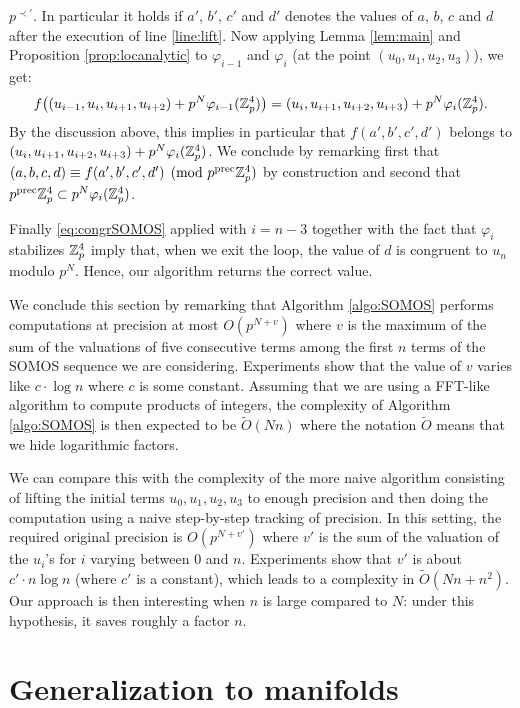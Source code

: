 \documentclass{lms}
\begin{document}
$p^{\prec'}$. In particular it holds if $a'$, $b'$, $c'$ and $d'$ denotes
the values of $a$, $b$, $c$ and $d$ after the execution of line
\ref{line:lift}. Now applying Lemma \ref{lem:main} and Proposition
\ref{prop:locanalytic} to $\varphi_{i-1}$ and $\varphi_i$ (at the point 
$(u_0, u_1, u_2, u_3)$), we get:
$$f\big((u_{i-1}, u_i, u_{i+1}, u_{i+2}) + p^N \varphi_{i-1}(\mathbb Z_p^4)\big)
= (u_i, u_{i+1}, u_{i+2}, u_{i+3}) + p^N \varphi_i(\mathbb Z_p^4).$$
By the discussion above, this implies in particular that $f(a',b',c',d')$
belongs to $(u_i, u_{i+1}, u_{i+2}, u_{i+3}) + p^N \varphi_i(\mathbb Z_p^4)$. We
conclude by remarking first that $(a,b,c,d) \equiv f(a',b',c',d') \pmod 
{p^{\text{\rm prec}} \mathbb Z_p^4}$ by construction and second that $p^{\text{\rm prec}} \mathbb Z_p^4 \subset
p^N \varphi_i(\mathbb Z_p^4)$.

Finally \eqref{eq:congrSOMOS} applied with $i = n-3$ together with
the fact that $\varphi_i$ stabilizes $\mathbb Z_p^4$ imply that, when we exit
the loop, the value of $d$ is congruent to $u_n$ modulo $p^N$. Hence,
our algorithm returns the correct value.

\medskip

We conclude this section by remarking that Algorithm 
\ref{algo:SOMOS} performs computations at precision at most $O(p^{N+v})$ 
where $v$ is the maximum of the sum of the valuations of five consecutive terms among 
the first $n$ terms of the SOMOS sequence we are considering. 
Experiments show that the value of $v$ varies like $c \cdot \log n$ 
where $c$ is some constant. Assuming that we are using a FFT-like 
algorithm to compute products of integers, the complexity of Algorithm 
\ref{algo:SOMOS} is then expected to be $\tilde O(N n)$ where the 
notation $\tilde O$ means that we hide logarithmic factors.

We can compare this with the complexity of the more naive algorithm 
consisting of lifting the initial terms $u_0, u_1, u_2, u_3$ to enough 
precision and then doing the computation using a naive step-by-step 
tracking of precision. In this setting, the required original precision 
is $O(p^{N+v'})$ where $v'$ is the sum of the valuation of the $u_i$'s 
for $i$ varying between $0$ and $n$. Experiments show that $v'$ is about 
$c' \cdot n \log n$ (where $c'$ is a constant), which leads to a 
complexity in $\tilde O (N n + n^2)$. Our approach is then interesting
when $n$ is large compared to $N$: under this hypothesis, it saves
roughly a factor $n$.

\appendix

\section{Generalization to manifolds}
\label{sec:manifold}
\end{document}

